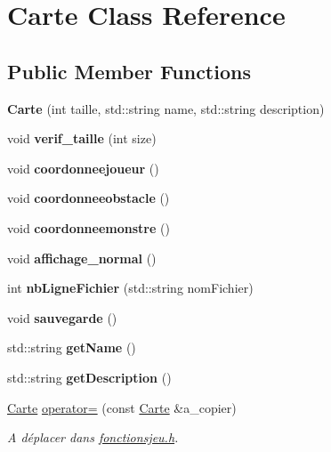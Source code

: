 \hypertarget{class_carte}{}\section{Carte Class Reference}
\label{class_carte}
\subsection*{Public Member Functions}
\begin{DoxyCompactItemize}
\item 
\mbox{\label{class_carte_a23c6f00e5cc97f469b8f8de4e37f54a9}} 
{\bfseries Carte} (int taille, std\+::string name, std\+::string description)
\item 
\mbox{\label{class_carte_a7b2d20b87438518ab3f7b66485e7de4d}} 
void {\bfseries verif\+\_\+taille} (int size)
\item 
\mbox{\label{class_carte_ae11b9253ce5aa727b6c49320f92e0668}} 
void {\bfseries coordonneejoueur} ()
\item 
\mbox{\label{class_carte_a2a0ac8476d52a07b9cbcec0507df840d}} 
void {\bfseries coordonneeobstacle} ()
\item 
\mbox{\label{class_carte_ad3f5fbdd5c6a248e92bad65680493ccd}} 
void {\bfseries coordonneemonstre} ()
\item 
\mbox{\label{class_carte_aa02757760851d19e549990e222d11fb5}} 
void {\bfseries affichage\+\_\+normal} ()
\item 
\mbox{\label{class_carte_a2cd533b7b1a04298a19e7eef566bc7f1}} 
int {\bfseries nb\+Ligne\+Fichier} (std\+::string nom\+Fichier)
\item 
\mbox{\label{class_carte_aceb1051f87ed3c407bfcf25fe4cc7778}} 
void {\bfseries sauvegarde} ()
\item 
\mbox{\label{class_carte_a376e889c21215615bfa3b5068f46e646}} 
std\+::string {\bfseries get\+Name} ()
\item 
\mbox{\label{class_carte_a591705d6bb95c36ce4a034b3107ae85c}} 
std\+::string {\bfseries get\+Description} ()
\item 
\mbox{\label{class_carte_a29068ef0d4091cc04a1cd66b0c84bb97}} 
\hyperlink{class_carte}{Carte} \hyperlink{class_carte_a29068ef0d4091cc04a1cd66b0c84bb97}{operator=} (const \hyperlink{class_carte}{Carte} \&a\+\_\+copier)
\begin{DoxyCompactList}\small\item\em A déplacer dans \hyperlink{fonctionsjeu_8h_source}{fonctionsjeu.\+h}. \end{DoxyCompactList}\end{DoxyCompactItemize}
